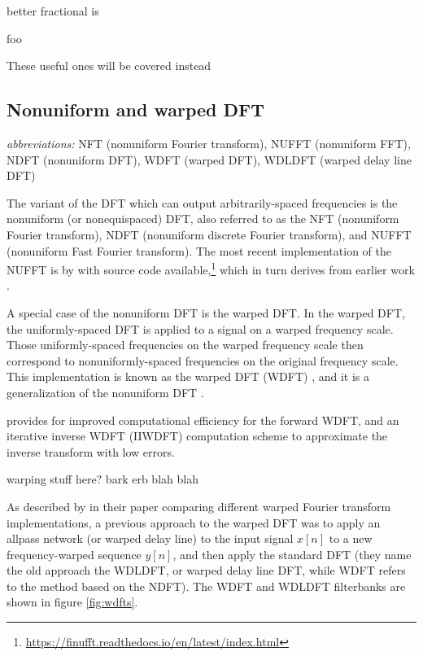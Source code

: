 \documentclass[letter,12pt,notitlepage]{article}
\begin{document}
better fractional is \citet{betterfractional}



foo

These useful ones will be covered instead

\subsection{Nonuniform and warped DFT}

\qquad \textit{abbreviations:} NFT (nonuniform Fourier transform), NUFFT (nonuniform FFT), NDFT (nonuniform DFT), WDFT (warped DFT), WDLDFT (warped delay line DFT)

The variant of the DFT which can output arbitrarily-spaced frequencies is the nonuniform (or nonequispaced) DFT, also referred to as the NFT (nonuniform Fourier transform), NDFT (nonuniform discrete Fourier transform), and NUFFT (nonuniform Fast Fourier transform). The most recent implementation of the NUFFT is by \citet{nufft1} with source code available,\footnote{\href{https://finufft.readthedocs.io/en/latest/index.html}{https://finufft.readthedocs.io/en/latest/index.html}} which in turn derives from earlier work \cite{nufft2, nufft3}.

A special case of the nonuniform DFT is the warped DFT. In the warped DFT, the uniformly-spaced DFT is applied to a signal on a warped frequency scale. Those uniformly-spaced frequencies on the warped frequency scale then correspond to nonuniformly-spaced frequencies on the original frequency scale. This implementation is known as the warped DFT (WDFT) \cite{warped1}, and it is a generalization of the nonuniform DFT \cite{nufft3}.

\citet{warped2} provides for improved computational efficiency for the forward WDFT, and an iterative inverse WDFT (IIWDFT) computation scheme to approximate the inverse transform with low errors.

warping stuff here? bark erb blah blah

As described by \citet{warpedcomparison} in their paper comparing different warped Fourier transform implementations, a previous approach to the warped DFT \cite{earlywarped1, earlywarped2} was to apply an allpass network (or warped delay line) to the input signal $x[n]$ to a new frequency-warped sequence $y[n]$, and then apply the standard DFT (they name the old approach the WDLDFT, or warped delay line DFT, while WDFT refers to the method based on the NDFT). The WDFT and WDLDFT filterbanks are shown in figure \ref{fig:wdfts}.
\end{document}
